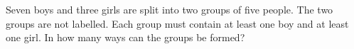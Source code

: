 Seven boys and three girls are split into two groups of five people. The two groups are not labelled. Each group must contain at least one boy and at least one girl. In how many ways can the groups be formed?
